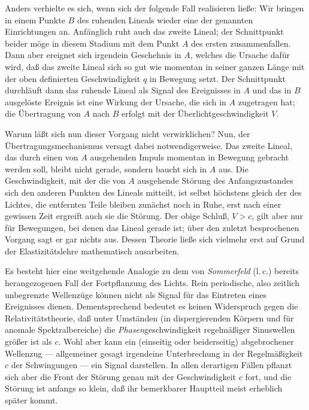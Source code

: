 \documentclass[12pt,a4paper]{article}
\begin{document}
Anders verhielte es sich, wenn sich der folgende Fall realisieren ließe:
Wir bringen in einem Punkte $B$ des ruhenden Lineals wieder eine der genannten Einrichtungen an.
Anfänglich ruht auch das zweite Lineal; der Schnittpunkt beider möge in diesem Stadium mit dem Punkt $A$ des ersten zusammenfallen.
Dann aber ereignet sich irgendein Geschehnis in $A$, welches die Ursache dafür wird, daß das zweite Lineal sich so gut wie momentan in seiner ganzen Länge mit der oben definierten Geschwindigkeit $q$ in Bewegung setzt.
Der Schnittpunkt durchläuft dann das ruhende Lineal als Signal des Ereignisses in $A$ und das in $B$ ausgelöste Ereignis ist eine Wirkung der Ursache, die sich in $A$ zugetragen hat; die Übertragung von $A$ nach $B$ erfolgt mit der Überlichtgeschwindigkeit $V$.

Warum läßt sich nun dieser Vorgang nicht verwirklichen?
Nun, der Übertragungsmechanismus versagt dabei notwendigerweise.
Das zweite Lineal, das durch einen von $A$ ausgehenden Impuls momentan in Bewegung gebracht werden soll, bleibt nicht gerade, sondern baucht sich in $A$ aus.
Die Geschwindigkeit, mit der die von $A$ ausgehende Störung des Anfangszustandes sich den anderen Punkten des Lineals mitteilt, ist selbst höchstens gleich der des Lichtes, die entfernten Teile bleiben zunächst noch in Ruhe, erst nach einer gewissen Zeit ergreift auch sie die Störung.
Der obige Schluß, $V > c$, gilt aber nur für Bewegungen, bei denen das Lineal gerade ist; über den zuletzt besprochenen Vorgang sagt er gar nichts aus.
Dessen Theorie ließe sich vielmehr erst auf Grund der Elastizitätslehre mathematisch ausarbeiten.

Es besteht hier eine weitgehende Analogie zu dem von \emph{Sommerfeld} (l.\,c.) bereits herangezogenen Fall der Fortpflanzung des Lichts.
Rein periodische, also zeitlich unbegrenzte Wellenzüge können nicht als Signal für das Eintreten eines Ereignisses dienen.
Dementsprechend bedeutet es keinen Widerspruch gegen die Relativitätstheorie, daß unter Umständen (in dispergierenden Körpern und für anomale Spektralbereiche) die \emph{Phasen}geschwindigkeit regelmäßiger Sinuswellen größer ist als $c$.
Wohl aber kann ein (einseitig oder beiderseitig) abgebrochener Wellenzug --- allgemeiner gesagt irgendeine Unterbrechung in der Regelmäßigkeit $c$ der Schwingungen --- ein Signal darstellen. %
In allen derartigen Fällen pflanzt sich aber die Front der Störung genau mit der Geschwindigkeit $c$ fort, und die Störung ist anfangs so klein, daß ihr bemerkbarer Hauptteil meist erheblich später kommt.
\end{document}
